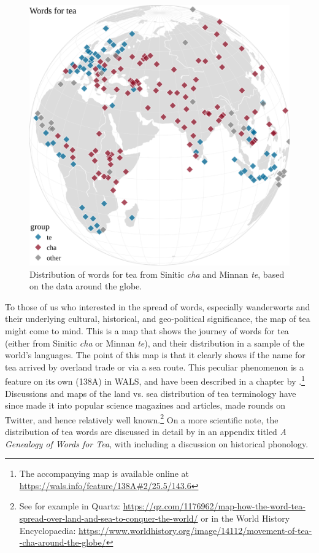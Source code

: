 \begin{figure}[ht!]
    \centering
    \includegraphics[width=\linewidth]{imgs/plots/distribution_tea.pdf}
    \caption{Distribution of words for tea from Sinitic \textit{cha} and Minnan \textit{te}, based on the data around the globe.}
    \label{fig:distribution_tea}
\end{figure}

To those of us who interested in the spread of words, especially \glspl{wanderwort} and their underlying cultural, historical, and geo-political significance, the map of tea might come to mind. This is a map that shows the journey of words for tea (either from Sinitic \textit{cha} or Minnan \textit{te}), and their distribution in a sample of the world's languages. The point of this map is that it clearly shows if the name for tea arrived by overland trade or via a sea route. This peculiar phenomenon is a feature on its own (138A) in \gls{WALS}, and have been described in a chapter by \textcite{dahl_tea_2013}.\footnote{The accompanying map is available online at \url{https://wals.info/feature/138A\#2/25.5/143.6}} Discussions and maps of the land vs. sea distribution of tea terminology have since made it into popular science magazines and articles, made rounds on Twitter, and hence relatively well known.\footnote{See for example \textcite{sonnad_tea_2018} in Quartz: \url{https://qz.com/1176962/map-how-the-word-tea-spread-over-land-and-sea-to-conquer-the-world/} or \textcite{netchev_movement_2022} in the World History Encyclopaedia: \url{https://www.worldhistory.org/image/14112/movement-of-tea--cha-around-the-globe/}} On a more scientific note, the distribution of tea words are discussed in detail by \parencite[261-270]{mair_true_2009} in an appendix titled \textit{A Genealogy of Words for Tea}, with including a discussion on historical phonology.

